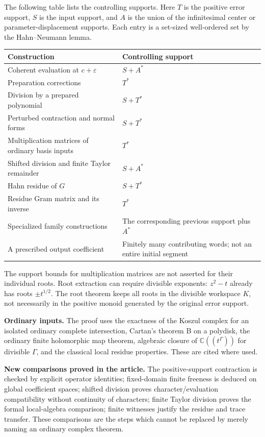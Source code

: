 \documentclass[11pt,letterpaper]{article}
\theoremstyle{definition}
\theoremstyle{remark}
\newcommand{\C}{\mathbb C}
\begin{document}
The following table lists the controlling supports. Here $T$ is the positive error support, $S$ is the input support, and $A$ is the union of the infinitesimal center or parameter-displacement supports. Each entry is a set-sized well-ordered set by the Hahn--Neumann lemma.

\begin{center}\small
\begin{longtable}{@{}L{0.46\textwidth}L{0.43\textwidth}@{}}
\toprule
Construction & Controlling support\\
\midrule
\endhead
Coherent evaluation at $c+\varepsilon$ & $S+A^*$\\[0.3em]
Preparation corrections & $T^*$\\[0.3em]
Division by a prepared polynomial & $S+T^*$\\[0.3em]
Perturbed contraction and normal forms & $S+T^*$\\[0.3em]
Multiplication matrices of ordinary basis inputs & $T^*$\\[0.3em]
Shifted division and finite Taylor remainder & $S+A^*$\\[0.3em]
Hahn residue of $G$ & $S+T^*$\\[0.3em]
Residue Gram matrix and its inverse & $T^*$\\[0.3em]
Specialized family constructions & The corresponding previous support plus $A^*$\\[0.3em]
A prescribed output coefficient & Finitely many contributing words; not an entire initial segment\\
\bottomrule
\end{longtable}
\end{center}

The support bounds for multiplication matrices are not asserted for their individual roots. Root extraction can require divisible exponents: $z^2-t$ already has roots $\pm t^{1/2}$. The root theorem keeps all roots in the divisible workspace $K$, not necessarily in the positive monoid generated by the original error support.

\noindent\textbf{Ordinary inputs.} The proof uses the exactness of the Koszul complex for an isolated ordinary complete intersection, Cartan's theorem B on a polydisk, the ordinary finite holomorphic map theorem, algebraic closure of $\C((t^\Gamma))$ for divisible $\Gamma$, and the classical local residue properties. These are cited where used.

\noindent\textbf{New comparisons proved in the article.} The positive-support contraction is checked by explicit operator identities; fixed-domain finite freeness is deduced on global coefficient spaces; shifted division proves character/evaluation compatibility without continuity of characters; finite Taylor division proves the formal local-algebra comparison; finite witnesses justify the residue and trace transfer. These comparisons are the steps which cannot be replaced by merely naming an ordinary complex theorem.
\end{document}
